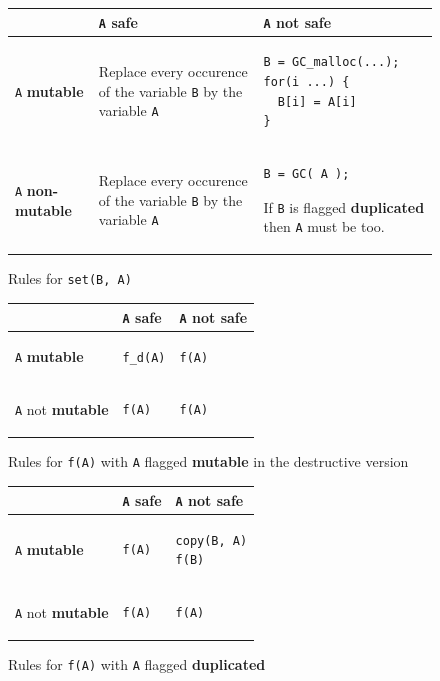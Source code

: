 \documentclass[12pt,a4paper,titlepage]{article}
\newcommand{\cl}[1]{\texttt{#1}}
\newcommand{\mut}{  \textbf{ mutable } }
\newcommand{\nmut}{ \textbf{ non-mutable } }
\newcommand{\bang}{ \textbf{ mutable } }
\newcommand{\safe}{ \textbf{ safe } }
\newcommand{\dupl}{ \textbf{ duplicated } }
\begin{document}
\begin{figure}[h!]
\begin{tabular}{|p{5.5cm}|p{5.5cm}|p{6cm}|}
\hline
             & \cl{A} \safe & \cl{A} not \safe \\ \hline
\cl{A} \mut  & Replace every occurence of the variable \cl{B} by the variable \cl{A} & \begin{lstlisting}
B = GC_malloc(...);
for(i ...) {
  B[i] = A[i]
}
\end{lstlisting} \\ \hline
\cl{A} \nmut & Replace every occurence of the variable \cl{B} by the variable \cl{A} & \begin{lstlisting}
B = GC( A );
\end{lstlisting}
If \cl{B} is flagged \dupl then \cl{A} must be too.
\\ \hline
\end{tabular}
\caption{Rules for \cl{set(B, A)}}
\end{figure}



\begin{figure}[h!]
\begin{tabular}{|p{5.5cm}|p{5.5cm}|p{6cm}|}
\hline
             & \cl{A} \safe & \cl{A} not \safe \\ \hline
\cl{A} \bang  &
\begin{lstlisting}
f_d(A)
\end{lstlisting} & \begin{lstlisting}
f(A)
\end{lstlisting} \\ \hline
\cl{A} not \bang & \begin{lstlisting}
f(A)
\end{lstlisting} & \begin{lstlisting}
f(A)
\end{lstlisting} \\ \hline
\end{tabular}
\caption{Rules for \cl{f(A)} with \cl{A} flagged \bang in the destructive version}
\end{figure}


\begin{figure}[h!]
\begin{tabular}{|p{5.5cm}|p{5.5cm}|p{6cm}|}
\hline
             & \cl{A} \safe & \cl{A} not \safe \\ \hline
\cl{A} \bang  &
\begin{lstlisting}
f(A)
\end{lstlisting} & \begin{lstlisting}
copy(B, A)
f(B)
\end{lstlisting} \\ \hline
\cl{A} not \bang & \begin{lstlisting}
f(A)
\end{lstlisting} & \begin{lstlisting}
f(A)
\end{lstlisting} \\ \hline
\end{tabular}
\caption{Rules for \cl{f(A)} with \cl{A} flagged \dupl}
\end{figure}
\end{document}
